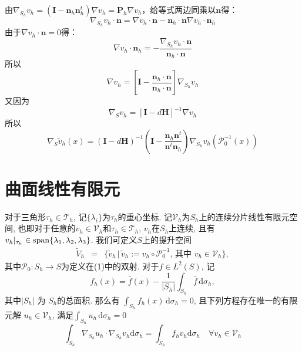 \documentclass{article}
\begin{document}
由$\nabla_{S_h}v_h=(\boldsymbol{I}-\boldsymbol{n}_h\boldsymbol{n}_h^t)\nabla v_h=\boldsymbol{P}_h\nabla v_h$，给等式两边同乘以$\boldsymbol{n}$得：
\begin{equation*}
\nabla_{S_h}v_h\cdot\boldsymbol{n}=\nabla v_h\cdot\boldsymbol{n}-\boldsymbol{n}_h\cdot\boldsymbol{n}\nabla v_h\cdot\boldsymbol{n}_h
\end{equation*}
由于$\nabla v_h\cdot\boldsymbol{n}=0$得：
\begin{equation*}
\nabla v_h\cdot\boldsymbol{n}_h=-\frac{\nabla_{S_h}v_h\cdot\boldsymbol{n}}{\boldsymbol{n}_h\cdot\boldsymbol{n}}
\end{equation*}
所以
\begin{equation*}
\nabla v_h=\left[\boldsymbol{I}-\frac{\boldsymbol{n}_h\cdot\boldsymbol{n}}{\boldsymbol{n}_h\cdot\boldsymbol{n}}\right]\nabla_{S_h}v_h
\end{equation*}
又因为
\begin{equation*}
\nabla_Sv_h=[\boldsymbol{I}-d\boldsymbol{H}]^{-1}\nabla v_h 
\end{equation*}
所以
\begin{equation*}
\nabla_{S}\tilde{v}_h(x)=(\boldsymbol{I}-d\boldsymbol{H})^{-1}\left(\boldsymbol{I}-\frac{\boldsymbol{n}_h\boldsymbol{n}^t}{\boldsymbol{n}^t\boldsymbol{n}_h}\right)\nabla_{S_h}v_h(\mathcal{P}^{-1}_0(x))
\end{equation*}
\section{曲面线性有限元}

对于三角形$\tau_h\in\mathcal{T}_h$, 记$\{\lambda_i\}$为$\tau_h$的重心坐标.   
记$\mathcal V_h$为$S_h$上的连续分片线性有限元空间, 也即对于任意的$v_h\in \mathcal V_h$和$\tau_h \in \mathcal T_h$,
$v_h$在$S_h$上连续, 且有$v_h|_{\tau_h}\in {\rm span}\{\lambda_1,\lambda_2,\lambda_3\}$.  
我们可定义$S$上的提升空间
\begin{eqnarray*}
 \tilde{V}_{h} & = &
\{\tilde{v}_{h} \, | \, \tilde{v}_{h}:=v_{h}\circ\mathcal{P}_{0}^{-1},\,
\text{其中 }v_{h}\in \mathcal V_h\},
\end{eqnarray*}
其中$\mathcal P_0: S_h \to S$为定义在(1)中的双射.   
对于$f\in L^{2}(S)$, 记
\begin{equation}\label{eq:fh}
f_{h}(x)=\bar{f}(x)-\frac{1}{|S_{h}|}\int_{S_{h}} \bar f \, \mathrm{d}\sigma_{h},
\end{equation}
其中$|S_{h}|$ 为 $ S_{h}$的总面积. 那么有
$\int_{S_{h}}f_{h}(x)\,\mathrm{d}\sigma_{h}=0$, 且下列方程存在唯一的有限元解
$u_{h}\in \mathcal V_h$, 满足$\int_{S_{h}}u_{h}\,\mathrm{d}\sigma_{h}=0$
\begin{equation*}
\int_{S_h}\nabla_{S_h}u_h\cdot\nabla_{S_h}v_h\mathrm{d}\sigma_h=\int_{S_h}f_hv_h\mathrm{d}\sigma_h\quad\forall v_h\in\mathcal{V}_h
\end{equation*}
\end{document}
